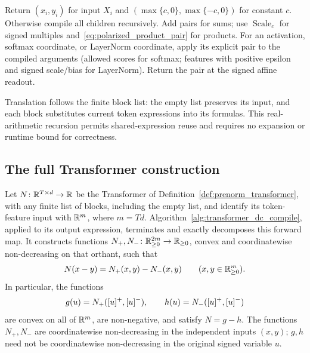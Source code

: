 \begin{algorithm}[htbp]
\DontPrintSemicolon
\caption{Recursive DC evaluation of a finite Transformer expression}
\label{alg:transformer_dc_compile}
Return $(x_i,y_i)$ for input $X_i$ and $(\max\{c,0\},\max\{-c,0\})$ for constant $c$.\;
Otherwise compile all children recursively. Add pairs for sums; use $\operatorname{Scale}_c$ for signed multiples and~\eqref{eq:polarized_product_pair} for products.\;
For an activation, softmax coordinate, or LayerNorm coordinate, apply its explicit pair to the compiled arguments (allowed scores for softmax; features with positive epsilon and signed scale/bias for LayerNorm).\;
Return the pair at the signed affine readout.\;
\end{algorithm}

Translation follows the finite block list: the empty list preserves its input, and each block substitutes current token expressions into its formulas. This real-arithmetic recursion permits shared-expression reuse and requires no expansion or runtime bound for correctness.

\subsection{The full Transformer construction}

\begin{theoremenv}\label{thm:transformer_dc}
Let $N\colon\mathbb{R}^{T\times d}\to\mathbb{R}$ be the Transformer of Definition~\ref{def:prenorm_transformer}, with any finite list of blocks, including the empty list, and identify its token-feature input with $\mathbb{R}^m$, where $m=Td$. Algorithm~\ref{alg:transformer_dc_compile}, applied to its output expression, terminates and exactly decomposes this forward map. It constructs functions
$N_+,N_-\colon\mathbb{R}^{2m}_{\ge0}\to\mathbb{R}_{\ge0}$,
convex and coordinatewise non-decreasing on that orthant, such that
\begin{equation}
    N(x-y)=N_+(x,y)-N_-(x,y)
    \qquad(x,y\in\mathbb{R}^m_{\ge0}).
    \label{eq:transformer_dc_recovery}
\end{equation}
In particular, the functions
\begin{equation}
    g(u)=N_+([u]^{+},[u]^{-}),\qquad
    h(u)=N_-([u]^{+},[u]^{-})
    \label{eq:transformer_raw_dc}
\end{equation}
are convex on all of $\mathbb{R}^m$, are non-negative, and satisfy $N=g-h$. The functions $N_+,N_-$ are coordinatewise non-decreasing in the independent inputs $(x,y)$; $g,h$ need not be coordinatewise non-decreasing in the original signed variable $u$.
\end{theoremenv}

